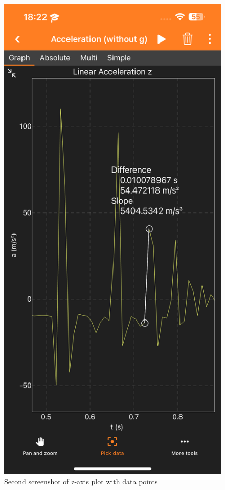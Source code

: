 \documentclass[idxtotoc,hyperref,openany]{labbook} %
\begin{document}
\begin{figure}[H] %
\begin{center}
\includegraphics[width=.7\linewidth]{images/Lab.02/PhoneDropZAnnotated2.PNG}
\end{center}
\caption{Second screenshot of z-axis plot with data points}
\label{fig:Lab02-PhoneDropZAnnotated2}
\end{figure}
\end{document}

